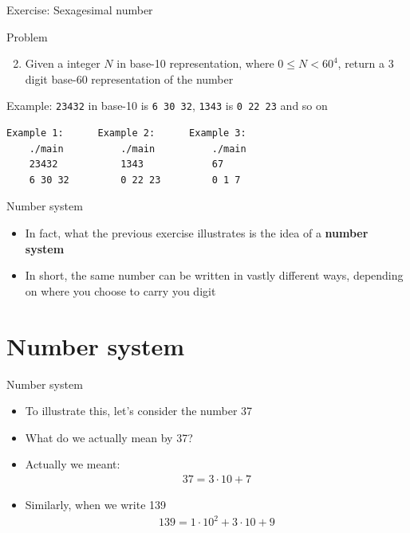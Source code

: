 \documentclass[10pt,xcolor={table,dvipsnames},t]{beamer}
\begin{document}
\begin{frame}[fragile]{Exercise: Sexagesimal number}
  \begin{exampleblock}{Problem}
      \begin{enumerate}
        \setcounter{enumi}{1}
        \item Given a integer $N$ in base-10 representation, where $0 \leq N <  60^4$, return a 3 digit base-60 representation of the number
      \end{enumerate}
  \end{exampleblock}
  \begin{exampleblock}{Example:}
  \texttt{23432} in base-10 is \texttt{6 30 32}, \texttt{1343} is \texttt{0 22 23} and so on
\begin{lstlisting}[language=bash]
    Example 1:      Example 2:      Example 3:
    ./main          ./main          ./main
    23432           1343            67
    6 30 32         0 22 23         0 1 7
\end{lstlisting}
  \end{exampleblock}
\end{frame}

\begin{frame}{Number system}
  \begin{itemize}
    \item In fact, what the previous exercise illustrates is the idea of a \textbf{number system}
    \item In short, the same number can be written in vastly different ways, depending on where you choose to carry you digit
  \end{itemize}
\end{frame}

\section{Number system}
\begin{frame}{Number system}
  \begin{itemize}
    \item To illustrate this, let's consider the number 37
    \item What do we actually mean by 37?
    \item Actually we meant:
    \begin{align*}
      37 = 3 \cdot 10 + 7
    \end{align*}
    \item Similarly, when we write 139
    \begin{align*}
      139 = 1 \cdot 10^2 + 3 \cdot 10 + 9
    \end{align*}
  \end{itemize}
\end{frame}
\end{document}
